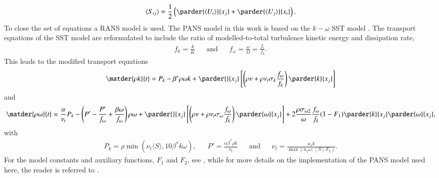 \documentclass[a4paper,10pt,preprint,3p]{elsarticle}
\begin{document}
\begin{equation}
\langle S_{ij} \rangle = \frac{1}{2} \left(\parder{\langle U_i \rangle}{x_j} + \parder{\langle U_j \rangle}{x_i}\right).
\end{equation}
To close the set of equations a RANS model is used. The PANS model in this work is based on the $k-\omega$ SST model \citep{pereira2018simulation,menter2003ten}. The transport equations of the SST model are reformulated to include the ratio of modelled-to-total turbulence kinetic energy and dissipation rate,
\begin{align}
	f_k = \frac{k}{K} && \textrm{and} && f_{\omega} = \frac{\omega}{\Omega} = \frac{f_{\epsilon}}{f_k}.
\end{align}
This leads to the modified transport equations
\begin{equation}\label{eq.PANSk}
\matder{\rho k}{t} = P_k - \beta^* \rho \omega k + \parder{}{x_j} \left[ \left(\rho \nu + \rho \nu_t \sigma_k \frac{f_{\omega}}{f_k} \right) \parder{k}{x_j}\right]
\end{equation}
and
\begin{equation}\label{eq.PANSomega}
\matder{\rho \omega}{t} = \frac{\alpha}{\nu_t} P_k - \left(P' - \frac{P'}{f_{\omega}} + \frac{\beta \omega}{f_{\omega}}\right) \rho \omega + \parder{}{x_j} \left[ \left(\rho \nu + \rho \nu_t \sigma_{\omega} \frac{f_{\omega}}{f_k} \right) \parder{\omega}{x_j}\right] + 2 \frac{\rho \sigma_{\omega2}}{\omega} \frac{f_{\omega}}{f_k} (1-F_1) \parder{k}{x_j} \parder{\omega}{x_j},
\end{equation}
with
\begin{align}\label{eq.PANS_eddyviscosity}
 P_k = \rho \min\left(\nu_t \langle S \rangle , 10\beta^* k \omega\right), &&	P' = \frac{\alpha \beta^* \rho k}{\nu_t} && \textrm{and} && \nu_t = \frac{a_1 k}{\max\left(a_1 \omega ; \left< S \right> F_2\right)}.
\end{align}
For the model constants and auxiliary functions, $F_1$ and $F_2$, see \citet{menter2003ten}, while for more details on the implementation of the PANS model used here, the reader is referred to \citet{pereira2015assessment}.
\end{document}
